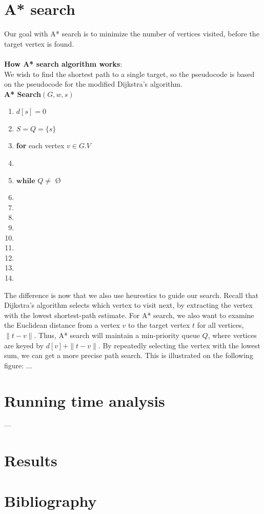\documentclass[11pt]{article}
\begin{document}
\section{A* search}
Our goal with A* search is to minimize the number of vertices visited, before the target vertex is found.\\\\







\textbf{How A* search algorithm works}:\\
We wish to find the shortest path to a single target, so the pseudocode is based on the pseudocode for the modified Dijkstra's algorithm.\\

\textbf{A* Search$(G, w, s)$}
\begin{enumerate}
\setlength\itemsep{0em}
\item $d[s] = 0$
\item $S = Q = \{s\}$
\item \textbf{for} each vertex $v \in G.V$
\item {}
\item $\textbf{while } Q \neq  $ \O
\item {}
\item {}
\item \tab{}
\item {}
\item \tab{}
\item \tab{}\tab{}
\item \tab{}\tab{}
\item \tab{}\tab{}
\item \tab{}\tab{}
\end{enumerate}
The difference is now that we also use heurestics to guide our search. Recall that Dijkstra's algorithm selects which vertex to visit next, by extracting the vertex with the lowest shortest-path estimate. For A* search, we also want to examine the Euclidean distance from a vertex $v$ to the target vertex $t$ for all vertices, $\|t-v\|$. Thus, A* search will maintain a min-priority queue $Q$, where vertices are keyed by $d[v]+\|t-v\|$. By repeatedly selecting the vertex with the lowest sum, we can get a more precise path search. This is illustrated on the following figure: ...\\



\section{Running time analysis}
---

\section{Results}
\section{Bibliography}
\end{document}
